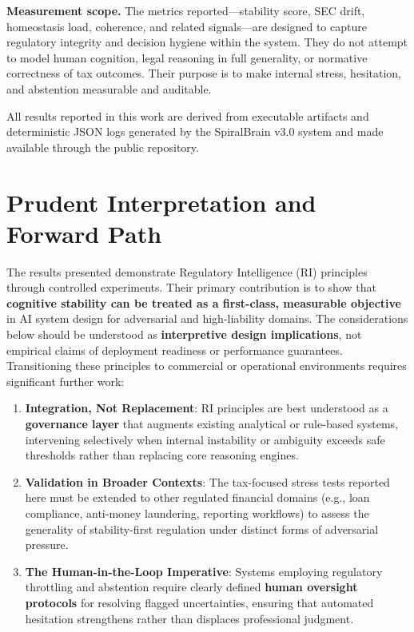 \documentclass[12pt,a4paper]{article}
\begin{document}
\textbf{Measurement scope.} The metrics reported—stability score, SEC drift, homeostasis load, coherence, and related signals—are designed to capture regulatory integrity and decision hygiene within the system. They do not attempt to model human cognition, legal reasoning in full generality, or normative correctness of tax outcomes. Their purpose is to make internal stress, hesitation, and abstention measurable and auditable.

All results reported in this work are derived from executable artifacts and deterministic JSON logs generated by the SpiralBrain v3.0 system and made available through the public repository.

\section{Prudent Interpretation and Forward Path}

The results presented demonstrate Regulatory Intelligence (RI) principles through controlled experiments. Their primary contribution is to show that \textbf{cognitive stability can be treated as a first-class, measurable objective} in AI system design for adversarial and high-liability domains. The considerations below should be understood as \textbf{interpretive design implications}, not empirical claims of deployment readiness or performance guarantees. Transitioning these principles to commercial or operational environments requires significant further work:

\begin{enumerate}
    \item \textbf{Integration, Not Replacement}: RI principles are best understood as a \textbf{governance layer} that augments existing analytical or rule-based systems, intervening selectively when internal instability or ambiguity exceeds safe thresholds rather than replacing core reasoning engines.

    \item \textbf{Validation in Broader Contexts}: The tax-focused stress tests reported here must be extended to other regulated financial domains (e.g., loan compliance, anti-money laundering, reporting workflows) to assess the generality of stability-first regulation under distinct forms of adversarial pressure.

    \item \textbf{The Human-in-the-Loop Imperative}: Systems employing regulatory throttling and abstention require clearly defined \textbf{human oversight protocols} for resolving flagged uncertainties, ensuring that automated hesitation strengthens rather than displaces professional judgment.
\end{enumerate}
\end{document}
